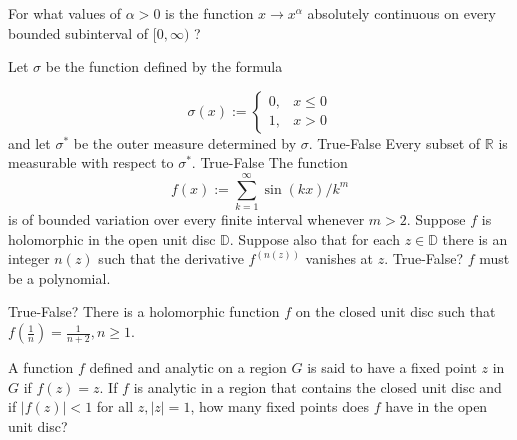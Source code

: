 \documentclass[14pt]{extarticle}
\begin{document}
For what values of $\alpha>0$ is the function $x \rightarrow x^{\alpha}$ absolutely continuous on every bounded subinterval of $[0, \infty)$ ?
\newpage

Let $\sigma$ be the function defined by the formula


$$
\sigma(x):= \begin{cases}0, & x \leq 0 \\ 1, & x>0\end{cases}
$$
and let $\sigma^{*}$ be the outer measure determined by $\sigma$. True-False Every subset of $\mathbb{R}$ is measurable with respect to $\sigma^{*}$.
\newpage
True-False The function
$$
f(x):=\sum_{k=1}^{\infty} \sin (k x) / k^{m}
$$
is of bounded variation over every finite interval whenever $m>2$.
\newpage
Suppose $f$ is holomorphic in the open unit disc $\mathbb{D}$. Suppose also that for each $z \in \mathbb{D}$ there is an integer $n(z)$ such that the derivative $f^{(n(z))}$ vanishes at $z$. True-False? $f$ must be a polynomial.
\newpage

True-False? There is a holomorphic function $f$ on the closed unit disc such that $f\left(\frac{1}{n}\right)=\frac{1}{n+2}, n \geq 1$.
\newpage

A function $f$ defined and analytic on a region $G$ is said to have a fixed point $z$ in $G$ if $f(z)=z$. If $f$ is analytic in a region that contains the closed unit disc and if $|f(z)|<1$ for all $z,|z|=1$, how many fixed points does $f$ have in the open unit disc?
\newpage
\end{document}
